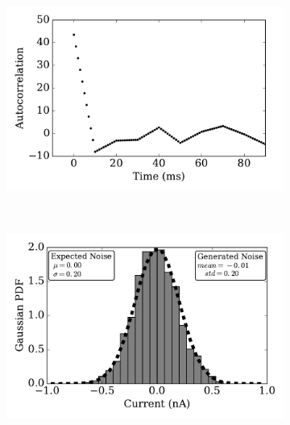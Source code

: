 \begin{figure}[tbp!]
\begin{subfigure}[t]{0.43\textwidth}
			\caption{}
		\end{subfigure}
		\begin{subfigure}[t]{0.43\textwidth}
			\includegraphics[width=\textwidth]{pics_iconip/autocorr_dt10.pdf}
			\caption{}
		\end{subfigure}\\
		\begin{subfigure}[t]{0.43\textwidth}
			\includegraphics[width=\textwidth]{pics_iconip/distr_dt1.pdf}
			\caption{}
		\end{subfigure}
		\begin{subfigure}[t]{0.43\textwidth}

\end{subfigure}
\end{figure}
